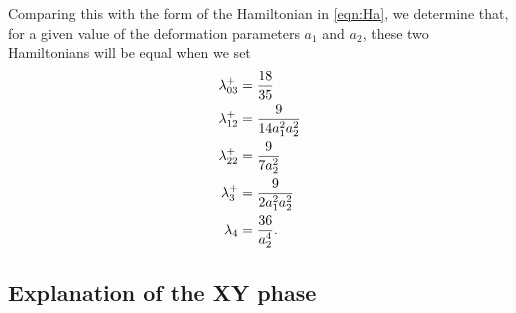 \documentclass[aps,prb,letterpaper,superscriptaddress,twocolumn,showpacs,floatfix,10pt]{revtex4-1}
\begin{document}
Comparing this with the form of the Hamiltonian in \eqref{eqn:Ha}, we determine
that, for a given value of the deformation parameters $a_1$ and $a_2$, these
two Hamiltonians will be equal when we set
\begin{align}
\lambda_{03}^+ &= \frac{18}{35}\notag\\
\lambda_{12}^+ &= \frac{9}{14a_1^2a_2^2}\notag\\
\lambda_{22}^+ &= \frac{9}{7a_2^2}\notag\\
\lambda_3^+ &= \frac{9}{2a_1^2a_2^2}\notag\\
\lambda_4 &= \frac{36}{a_2^4}.
\end{align}

\subsection{Explanation of the XY phase}
\label{app:XY-theory}
\end{document}

